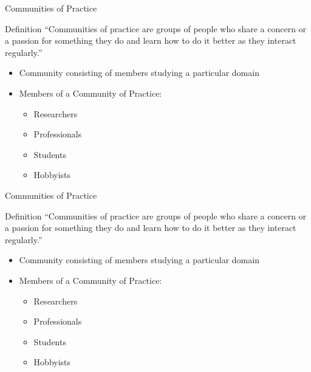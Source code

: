 \begin{frame}{Communities of Practice}
  \begin{block}{Definition}
    ``Communities of practice are groups of people who share a concern or a
    passion for something they do and learn how to do it better as they interact regularly.'' \cite{Weng98}
  \end{block}
  \begin{itemize}
    \item Community consisting of members studying a particular domain
    \item Members of a Community of Practice:
          \begin{itemize}
            \item Researchers
            \item Professionals
            \item Students
            \item Hobbyists
          \end{itemize} %
  \end{itemize}
\end{frame}

\begin{frame}{Communities of Practice}
  \begin{block}{Definition}
    ``Communities of practice are groups of people who share a concern or a
    passion for something they do and learn how to do it better as they interact regularly.'' \cite{Weng98}
  \end{block}
  \begin{itemize}
    \item Community consisting of members studying a particular domain
    \item Members of a Community of Practice:
          \begin{itemize}
            \item Researchers
            \item Professionals
            \item Students
            \item Hobbyists
          \end{itemize}
  \end{itemize}
\end{frame}

